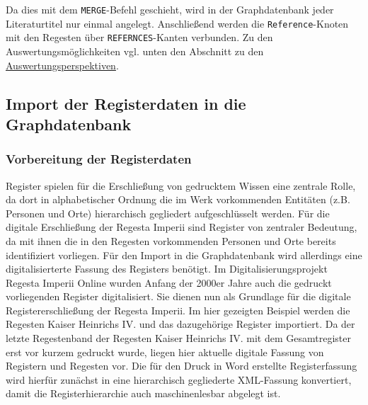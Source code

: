 Da dies mit dem \texttt{MERGE}-Befehl geschieht, wird in der
Graphdatenbank jeder Literaturtitel nur einmal angelegt. Anschließend
werden die \texttt{Reference}-Knoten mit den Regesten über
\texttt{REFERNCES}-Kanten verbunden. Zu den Auswertungsmöglichkeiten
vgl. unten den Abschnitt zu den
\protect\hyperlink{ux5cux23Auswertungsperspektiven}{Auswertungsperspektiven}.

\hypertarget{import-der-registerdaten-in-die-graphdatenbank}{%
\subsection{Import der Registerdaten in die
Graphdatenbank}\label{import-der-registerdaten-in-die-graphdatenbank}}

\hypertarget{vorbereitung-der-registerdaten}{%
\subsubsection{Vorbereitung der
Registerdaten}\label{vorbereitung-der-registerdaten}}

Register spielen für die Erschließung von gedrucktem Wissen eine
zentrale Rolle, da dort in alphabetischer Ordnung die im Werk
vorkommenden Entitäten (z.B. Personen und Orte) hierarchisch gegliedert
aufgeschlüsselt werden. Für die digitale Erschließung der Regesta
Imperii sind Register von zentraler Bedeutung, da mit ihnen die in den
Regesten vorkommenden Personen und Orte bereits identifiziert vorliegen.
Für den Import in die Graphdatenbank wird allerdings eine
digitalisierterte Fassung des Registers benötigt. Im
Digitalisierungsprojekt Regesta Imperii Online wurden Anfang der 2000er
Jahre auch die gedruckt vorliegenden Register digitalisiert. Sie dienen
nun als Grundlage für die digitale Registererschließung der Regesta
Imperii. Im hier gezeigten Beispiel werden die Regesten Kaiser Heinrichs
IV. und das dazugehörige Register importiert. Da der letzte Regestenband
der Regesten Kaiser Heinrichs IV. mit dem Gesamtregister erst vor kurzem
gedruckt wurde, liegen hier aktuelle digitale Fassung von Registern und
Regesten vor. Die für den Druck in Word erstellte Registerfassung wird
hierfür zunächst in eine hierarchisch gegliederte XML-Fassung
konvertiert, damit die Registerhierarchie auch maschinenlesbar abgelegt
ist.

